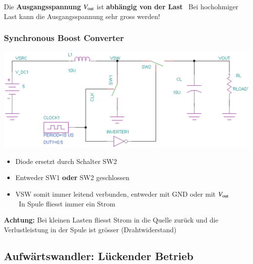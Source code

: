 \vspace{0.2cm}
Die \textbf{Ausgangsspannung} $V_{\rm out}$ ist \textbf{abhängig von der Last} 
\textrightarrow\ Bei hochohmiger Last kann die Ausgangsspannung sehr gross werden!

\subsubsection{Synchronous Boost Converter}

\begin{minipage}{0.4\columnwidth}
    \includegraphics[width=\columnwidth]{images/synchronous_boost_converter.png}
\end{minipage}
\hfill
\begin{minipage}{0.58\columnwidth}
    \begin{itemize}
        \item Diode ersetzt durch Schalter SW2
        \item Entweder SW1 \textbf{oder} SW2 geschlossen
        \item VSW somit immer leitend verbunden, entweder mit GND oder mit $V_{\rm out}$ \\
            \textrightarrow\ In Spule fliesst immer ein Strom
    \end{itemize}
\end{minipage}

\textbf{Achtung:} Bei kleinen Lasten fliesst Strom in die Quelle zurück und die Verlustleistung in der Spule ist grösser (Drahtwiderstand)


\subsection{Aufwärtswandler: Lückender Betrieb}

